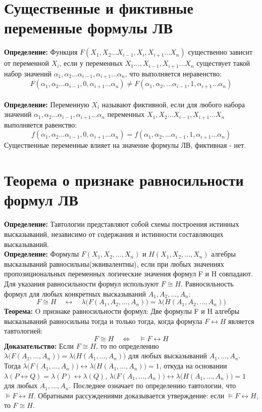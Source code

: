 \documentclass[../main.tex]{subfiles}
\begin{document}
\section{Существенные и фиктивные переменные формулы ЛВ}
\textbf{Определение:
} Функция $F(X_1, X_2 … X_{i-1}, X_i, X_{i+1} \ldots X_n)$ существенно зависит от переменной $X_i$, если у переменных $X_1 \ldots, X_{i-1}, X_{i+1} \ldots X_n$ существует такой набор значений $\alpha_1, \alpha_2 \ldots \alpha_{i-1}, \alpha_{i+1} \ldots \alpha_n$, что выполняется неравенство:  
\[F(\alpha_1, \alpha_2 \ldots \alpha_{i-1}, 0, \alpha_{i+1} \ldots \alpha_n) \ne F(\alpha_1,\alpha_2, \ldots \alpha_{i-1}, 1, \alpha_{i+1} \ldots \alpha_n)\]
\\
\textbf{Определение:
} Переменную $X_i$ называют фиктивной, если для любого набора значений $\alpha_1, \alpha_2 \ldots \alpha_{i-1}, \alpha_{i+1} \ldots \alpha_n$ переменных $X_1, X_2 \ldots X_{i-1}, X_{i+1} \ldots X_n$ выполняется равенство:
\[f(\alpha_1, \alpha_2 \ldots \alpha_{i-1}, 0, \alpha_{i+1} \ldots \alpha_n) = f(\alpha_1,\alpha_2, \ldots \alpha_{i-1}, 1, \alpha_{i+1} \ldots \alpha_n)\]
Существенные переменные влияет на значение формулы ЛВ, фиктивная - нет.

\section{Теорема о признаке равносильности формул ЛВ}
\textbf{Определение:
} Тавтологии представляют собой схемы построения истинных высказываний, независимо от содержания и истинности составляющих высказываний.\\
\textbf{
	Определение:
} Формулы $F(X_1,X_2,\ldots,X_n)$ и $H(X_1,X_2,\ldots,X_n)$ алгебры высказываний равносильны(эквивалентны), если при любых значениях пропозициональных переменных логические значения формул F и H совпадают. Для указания равносильности формул используют $F\cong H$. Равносильность формул для любых конкретных высказываний $A_1,A_2,\ldots,A_n$:\\
\[F\cong H\quad\leftrightarrow\quad \lambda \bigl(F(A_1, A_2,\ldots,A_n)\bigr)= \lambda\bigl(H(A_1,A_2,\ldots,A_n)\bigr)\]
\textbf{
	Теорема:
} O признаке равносильности формул: Две формулы F и H алгебры высказываний равносильны тогда и только тогда, когда формула $F\leftrightarrow H$ является тавтологией:\\
\[F\cong H\quad \Leftrightarrow\quad \vDash F\leftrightarrow H\]
\textbf{
	Доказательство:
} Если $F\cong H$, то по определению $\lambda\bigl(F(A_1,\ldots,A_n)\bigr)= \lambda\bigl(H(A_1,\ldots,A_n)\bigr)$ для любых высказываний $A_1,\ldots,A_n$. Тогда $\lambda\bigl(F(A_1,\ldots,A_n)\bigr)\leftrightarrow \lambda\bigl(H(A_1,\ldots,A_n)\bigr)=1$, откуда на основании $\lambda(P\leftrightarrow Q)= \lambda(P) \leftrightarrow \lambda(Q)$, $\lambda\bigl(F(A_1, \ldots,A_n) \bigr)\leftrightarrow \lambda\bigl(H(A_1,\ldots,A_n)\bigr)=1$ для любых $A_1,\ldots,A_n$. Последнее означает по определению тавтологии, что $\vDash F\leftrightarrow H$. Обратными рассуждениями доказывается утверждение: если $\vDash F\leftrightarrow H$, то $F\cong H$.
\end{document}
